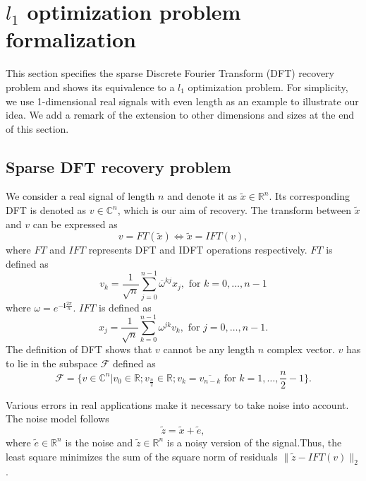 \documentclass[final,onefignum,onetabnum]{siamart190516}
\newcounter{example}
\begin{document}
\section{$l_1$ optimization problem formalization}\label{sec:opt_formalization}
\label{sec:probemformalization}
This section specifies the sparse Discrete Fourier Transform (DFT) recovery problem and shows its equivalence to a $l_1$ optimization problem. For simplicity, we use 1-dimensional real signals with even length as an example to illustrate our idea. We add a remark of the extension to other dimensions and sizes at the end of this section.

\subsection{Sparse DFT recovery problem}
\label{subsec:sparseDFTrecovery}
We consider a real signal of length $n$ and denote it as $\widetilde{x}\in\mathbb{R}^n$. Its corresponding DFT is denoted as $v\in\mathbb{C}^n$, which is our aim of recovery. The transform between $\widetilde{x}$ and $v$ can be expressed as
\begin{equation}
    v = FT(\widetilde{x}) \iff \widetilde{x} = IFT(v),
\end{equation}
where $FT$ and $IFT$ represents DFT and IDFT operations respectively. $FT$ is defined as
\begin{equation}\label{FTdef}
    v_{k} = \frac{1}{\sqrt{n}}\sum_{j=0}^{n-1}\overline{\omega}^{kj}x_j,\text{ for }k = 0,\dots,n-1
\end{equation}
where $\omega = e^{-\mathbf{i}\frac{2\pi}{n}}$. $IFT$ is defined as
\begin{equation}\label{FTdef}
    x_{j} = \frac{1}{\sqrt{n}}\sum_{k=0}^{n-1}\omega^{jk}v_k,\text{ for }j = 0,\dots,n-1.
\end{equation}
The definition of DFT shows that $v$ cannot be any length $n$ complex vector.  $v$ has to lie in the subspace $\mathcal{F}$ defined as
\begin{equation}\label{F}
    \mathcal{F} = \{v\in\mathbb{C}^n|v_0\in\mathbb{R}; v_{\frac{n}{2}}\in\mathbb{R}; v_k = \overline{v_{n-k}}\text{ for }k = 1,\dots,\frac{n}{2}-1\}.
\end{equation}

Various errors in real applications make it necessary to take noise into account. The noise model follows
\begin{equation}
    \widetilde{z} = \widetilde{x} + \widetilde{e},
\end{equation}
where $\widetilde{e}\in\mathbb{R}^n$ is the noise and $\widetilde{z}\in\mathbb{R}^n$ is a noisy version of the signal.Thus, the least square minimizes the sum of the square norm of residuals $\|\widetilde{z}-IFT(v)\|_2$.
\end{document}
